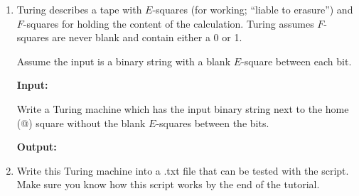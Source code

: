 \documentclass[11pt]{report}
\begin{document}
\begin{enumerate}
	\item Turing describes a tape with $E$-squares (for working; ``liable to erasure'') and $F$-squares for holding the content of the calculation. Turing assumes $F$-squares are never blank and contain either a 0 or 1.
	
	Assume the input is a binary string with a blank $E$-square between each bit. 
	
	\hspace{0.3cm} {\bf Input: } 	

	Write a Turing machine which has the input binary string next to the home (@) square without the blank $E$-squares between the bits. 

	\hspace{0.3cm} {\bf Output: } 



	\vspace{8cm}

	\item Write this Turing machine into a .txt file that can be tested with the script. Make sure you know how this script works by the end of the tutorial.


\end{enumerate}
\end{document}

